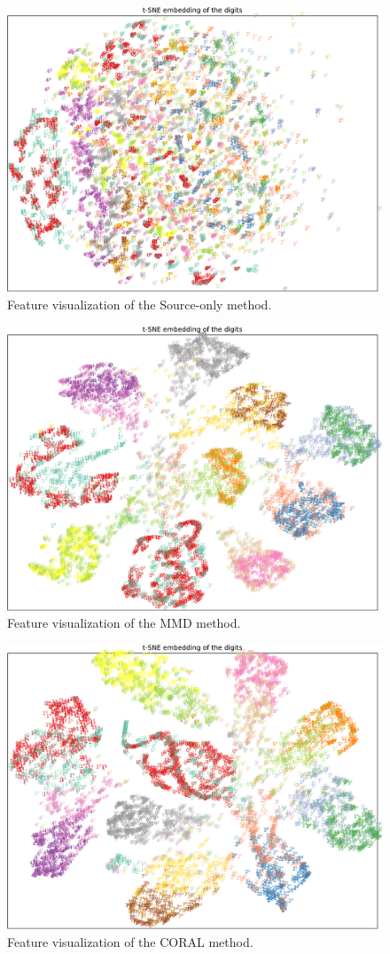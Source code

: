 \documentclass{article} %
\begin{document}
\begin{figure}[h]
	\centering
	\includegraphics[width=0.7\linewidth]{figs/source-only-44300emb-st}
	\caption{Feature visualization of the Source-only method.}
	\label{fig:t-nse-s-only}
\end{figure}


\begin{figure}[h]
	\centering
	\includegraphics[width=0.7\linewidth]{figs/mmd-37000emb-st}
	\caption{Feature visualization of the MMD method.}
	\label{fig:t-nse-mmd}
\end{figure}

\begin{figure}[h]
	\centering
	\includegraphics[width=0.7\linewidth]{figs/coral-47300emb-st}
	\caption{Feature visualization of the CORAL method.}
	\label{fig:t-nse-coral}
\end{figure}
\end{document}
